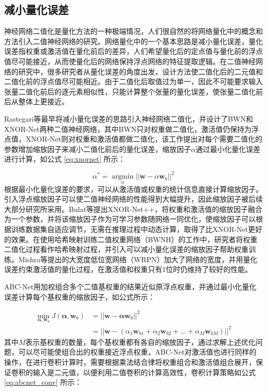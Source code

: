 \subsection{减小量化误差}

神经网络二值化是量化方法的一种极端情况，人们很自然的将网络量化中的概念和方法引入二值神经网络的研究。网络量化中的一个基本思路是减小量化误差，量化误差指权重或激活值在量化前后的差异，人们希望量化后的定点值与量化前的浮点值尽可能接近，从而使量化后的网络保持浮点网络的特征提取逻辑。在二值神经网络的研究中，很多研究者从量化误差的角度出发，设计方法使二值化后的二元值和二值化前的浮点值尽可能相近。由于二值化后取值过为单一，因此不可能要求输入张量二值化前后的逐元素相似性，只能计算整个张量的量化误差，使张量二值化前后从整体上更接近。

Rastegari等\cite{xnornet}最早将减小量化误差的思路引入神经网络二值化，并设计了BWN和XNOR-Net两种二值神经网络，其中BWN只对权重做二值化，激活值仍保持为浮点值，XNOR-Net则对权重和激活值都做二值化，该工作提出对每个需要二值化的参数增加缩放因子来减小二值化前后的量化误差，缩放因子$\alpha$通过最小化量化误差进行计算，如公式 \eqref{eq:xnornet} 所示：

\begin{equation}
  \label{eq:xnornet}
  \alpha^* = \mathop{\arg\min}\limits_{\alpha} ||\bm{w} - \alpha\bm{w}_b||^2
\end{equation}
根据最小化量化误差的要求，可以从激活值或权重的统计信息直接计算缩放因子。引入浮点缩放因子可以使二值神经网络的性能得到大幅提升，因此缩放因子被后续大部分研究所采用。Bulat等提出XNOR-Net++\cite{xnornet++}，将权重和激活值的缩放因子融合为一个参数，并将该缩放因子作为可学习参数随网络一同优化，使缩放因子可以根据训练数据集自适应调节，无需在推理过程中动态计算，取得了比XNOR-Net更好的效果。在使用哈希映射训练二值权重网络\cite{bwnh}（BWNH）的工作中，研究者将权重二值化过程看作哈希映射过程，并引入可以减小量化误差的缩放因子帮助权重训练。Mishra等提出的大宽度低位宽网络\cite{wrpn}（WRPN）加大了网络的宽度，并用量化误差约束激活值的量化过程，在激活值和权重只有1位时仍维持了较好的性能。

ABC-Net\cite{abcnet}用加权组合多个二值基权重的结果近似原浮点权重，并通过最小化量化误差计算每个基权重的缩放因子，如公式所示：

\begin{equation}
  \label{eq:abcnet}
  \begin{split}
  \min_{\bm{\alpha}, \bm{w}_b}J(\bm{\alpha}, \bm{w}_b) & = ||\bm{w} - \bm{\alpha}\bm{w}_b||^2 \\
  & = ||\bm{w} - (\alpha_1 \bm{w}_{b1} + \alpha_2 \bm{w}_{b2} + \dots + \alpha_M \bm{w}_{bM})||^2
  \end{split}
\end{equation}
其中$M$表示基权重的数量，每个基权重都有各自的缩放因子，通过求解上述优化问题，可以尽可能使组合出的权重接近浮点权重，ABC-Net对激活值也进行同样的操作，在进行卷积计算时，需要根据乘法结合律将权重组合和激活值组合展开，保证卷积的输入是二元值，以便利用二值卷积的计算高效性，卷积计算策略如公式 \eqref{eq:abcnet_conv} 所示：

